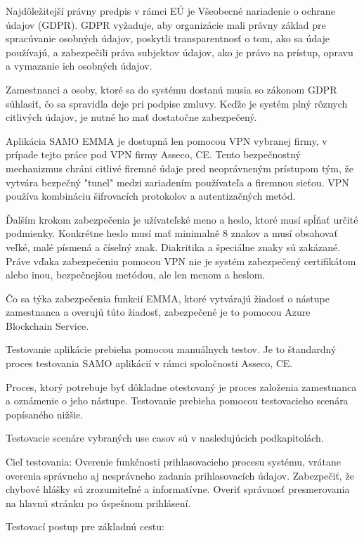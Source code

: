 Najdôležitejší právny predpis v rámci EÚ je Všeobecné nariadenie o ochrane údajov (GDPR). GDPR vyžaduje, aby organizácie mali právny základ pre spracúvanie osobných údajov, poskytli transparentnosť o tom, ako sa údaje používajú, a zabezpečili práva subjektov údajov, ako je právo na prístup, opravu a vymazanie ich osobných údajov.

Zamestnanci a osoby, ktoré sa do systému dostanú musia so zákonom GDPR súhlasiť, čo sa spravidla deje pri podpise zmluvy. Keďže je systém plný rôznych citlivých údajov, je nutné ho mať dostatočne zabezpečený.

Aplikácia SAMO EMMA je dostupná len pomocou VPN vybranej firmy, v prípade tejto práce pod VPN firmy Asseco, CE. Tento bezpečnostný mechanizmus chráni citlivé firemné údaje pred neoprávneným prístupom tým, že vytvára bezpečný "tunel" medzi zariadením používateľa a firemnou sieťou. VPN používa kombináciu šifrovacích protokolov a autentizačných metód.

Ďalším krokom zabezpečenia je užívateľské meno a heslo, ktoré musí spĺňať určité podmienky. Konkrétne heslo musí mať minimalně 8 znakov a musí obsahovať veľké, malé písmená a číselný znak. Diakritika a špeciálne znaky sú zakázané. Práve vďaka zabezpečeniu pomocou VPN nie je systém zabezpečený certifikátom alebo inou, bezpečnejšou metódou, ale len menom a heslom.

Čo sa týka zabezpečenia funkcií EMMA, ktoré vytvárajú žiadosť o nástupe zamestnanca a overujú túto žiadosť, zabezpečené je to pomocou Azure Blockchain Service.


Testovanie aplikácie prebieha pomocou manuálnych testov. Je to štandardný proces testovania SAMO aplikácií v rámci spoločnosti Asseco, CE. 

Proces, ktorý potrebuje byť dôkladne otestovaný je proces založenia zamestnanca a oznámenie o jeho nástupe. Testovanie prebieha pomocou testovacieho scenára popísaného nižšie.

Testovacie scenáre vybraných use casov sú v nasledujúcich podkapitolách.

Cieľ testovania: Overenie funkčnosti prihlasovacieho procesu systému, vrátane overenia správneho aj nesprávneho zadania prihlasovacích údajov. Zabezpečiť, že chybové hlášky sú zrozumiteľné a informatívne. Overiť správnosť presmerovania na hlavnú stránku po úspešnom prihlásení.

\blank
Testovací postup pre základnú cestu:

